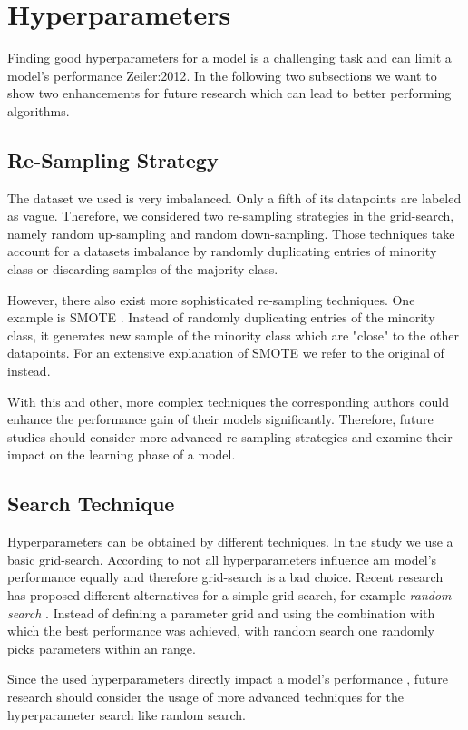 \section{Hyperparameters}
\label{chp:future_work:sec:hyperparameters}
Finding good hyperparameters for a model is a challenging task and can limit a model's performance \parencite{Bergstra:2011}{Zeiler:2012}.
In the following two subsections we want to show two enhancements for future research which can lead to better performing algorithms.

\subsection{Re-Sampling Strategy}
\label{chp:future_work:sec:hyperparameters:re_sampling_strategy}
The dataset we used is very imbalanced.
Only a fifth of its datapoints are labeled as vague.
Therefore, we considered two re-sampling strategies in the grid-search, namely random up-sampling and random down-sampling.
Those techniques take account for a datasets imbalance by randomly duplicating entries of minority class or discarding samples of the majority class.

However, there also exist more sophisticated re-sampling techniques.
One example is \ac{SMOTE} \parencite{Chawla:2002}.
Instead of randomly duplicating entries of the minority class, it generates new sample of the minority class which are "close" to the other datapoints.
For an extensive explanation of \ac{SMOTE} we refer to the original of \textcite{Chawla:2002} instead.

With this and other, more complex techniques the corresponding authors could enhance the performance gain of their models significantly.
Therefore, future studies should consider more advanced re-sampling strategies and examine their impact on the learning phase of a model.

\subsection{Search Technique}
\label{chp:future_work:sec:hyperparameters:search_technique}
Hyperparameters can be obtained by different techniques.
In the study we use a basic grid-search.
According to \textcite{Bergstra:2012} not all hyperparameters influence am model's performance equally and therefore grid-search is a bad choice.
Recent research has proposed different alternatives for a simple grid-search, for example \textit{random search} \parencite{Bergstra:2012}.
Instead of defining a parameter grid and using the combination with which the best performance was achieved, with random search one randomly picks parameters within an range.

Since the used hyperparameters directly impact a model's performance \parencite{Claesen:2015}, future research should consider the usage of more advanced techniques for the hyperparameter search like random search.
